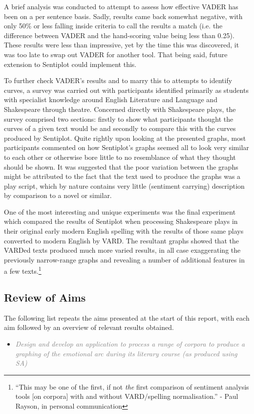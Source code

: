 \documentclass{article}
\begin{document}
{    A brief analysis was conducted to attempt to assess how effective VADER has been on a per sentence basis. Sadly, results came back somewhat negative, with only 50\% or less falling inside criteria to call the results a match (i.e. the difference between VADER and the hand-scoring value being less than 0.25). These results were less than impressive, yet by the time this was discovered, it was too late to swap out VADER for another tool. That being said, future extension to Sentiplot could implement this.
    
    To further check VADER's results and to marry this to attempts to identify curves, a survey was carried out with participants identified primarily as students with specialist knowledge around English Literature and Language and Shakespeare through theatre. Concerned directly with Shakespeare plays, the survey comprised two sections: firstly to show what participants thought the curves of a given text would be and secondly to compare this with the curves produced by Sentiplot. Quite rightly upon looking at the presented graphs, most participants commented on how Sentiplot's graphs seemed all to look very similar to each other or otherwise bore little to no resemblance of what they thought should be shown. It was suggested that the poor variation between the graphs might be attributed to the fact that the text used to produce the graphs was a play script, which by nature contains very little (sentiment carrying) description by comparison to a novel or similar.

    One of the most interesting and unique experiments was the final experiment which compared the results of Sentiplot when processing Shakespeare plays in their original early modern English spelling with the results of those same plays converted to modern English by VARD. The resultant graphs showed that the VARDed texts produced much more varied results, in all case exaggerating the previously narrow-range graphs and revealing a number of additional features in a few texts.\footnote{``This may be one of the first, if not \textit{the} first comparison of sentiment analysis tools [on corpora] with and without VARD/spelling normalisation.'' - Paul Rayson, in personal communication}
    \subsection{Review of Aims}
        The following list repeats the aims presented at the start of this report, with each aim followed by an overview of relevant results obtained.
        \begin{itemize}
            \item \textcolor{gray}{\textit{Design and develop an application to process a range of corpora to produce a graphing of the emotional arc during its literary course (as produced using SA)}}
            

\end{itemize}}
\end{document}
